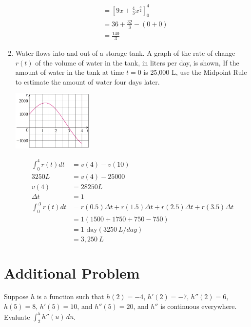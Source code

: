 \documentclass{article}
\begin{document}
\begin{enumerate}
$$\begin{align}
		&=\left[9x+\frac{4}{3}x^{\frac{3}{2}}\right]_0^4\\
		&=36+\frac{32}{3}-(0+0)\\
		&=\frac{140}{3}
	\end{align}$$
\setcounter{enumi}{67}
	\item Water flows into and out of a storage tank. A graph of the rate of change $r(t)$ of the volume of water in the tank, in liters per day, is shown, If the amount of water in the tank at time $t=0$ is 25,000 L, use the Midpoint Rule to estimate the amount of water four days later.
	\begin{center}
		\includegraphics[width=4cm]{images/53pr58}
	\end{center}
	$$\begin{align}
		\int_{0}^{4}r(t)dt&= v(4)-v(10)\\
		3250L&=v(4)-25000\\
		v(4)&=28250L\\
		\Delta t &= 1\\
		\int_{0}^{\Delta}r(t)dt&=r(0.5)\Delta t + r(1.5)\Delta t + r(2.5)\Delta t + r(3.5)\Delta t\\
		&=1(1500+1750+750-750)\\
		&=1\text{ day}(3250\ L/day)\\
		&=3,250\ L
	\end{align}$$
\end{enumerate}

\section{Additional Problem}
Suppose \(h\) is a function such that \(h(2)=-4\), \(h'(2)=-7\), \(h''(2)=6\), \(h(5)=8\), \(h'(5)=10\), and \(h''(5)=20\), and \(h''\) is continuous everywhere. Evaluate \(\int_2^5h''(u)\,du\).
\end{document}
